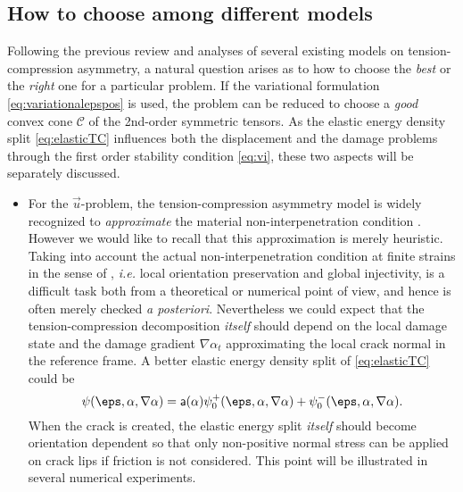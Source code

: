 \subsection{How to choose among different models} \label{sec:howtochoose}
Following the previous review and analyses of several existing models on tension-compression asymmetry, a natural question arises as to how to choose the \emph{best} or the \emph{right} one for a particular problem. If the variational formulation \eqref{eq:variationalepspos} is used, the problem can be reduced to choose a \emph{good} convex cone $\mathcal{C}$ of the 2nd-order symmetric tensors. As the elastic energy density split \eqref{eq:elasticTC} influences both the displacement and the damage problems through the first order stability condition \eqref{eq:vi}, these two aspects will be separately discussed.
\begin{itemize}
\item For the $\vec{u}$-problem, the tension-compression asymmetry model is widely recognized to \emph{approximate} the material non-interpenetration condition \cite{LancioniRoyer-Carfagni:2009,AmorMarigoMaurini:2009,AmbatiGerasimovLorenzis:2015}. However we would like to recall that this approximation is merely heuristic. Taking into account the actual non-interpenetration condition at finite strains in the sense of \cite{CiarletNecas:1987}, \emph{i.e.} local orientation preservation and global injectivity, is a difficult task both from a theoretical or numerical point of view, and hence is often merely checked \emph{a posteriori}. Nevertheless we could expect that the tension-compression decomposition \emph{itself} should depend on the local damage state and the damage gradient $\nabla\alpha_t$ approximating the local crack normal in the reference frame. A better elastic energy density split of \eqref{eq:elasticTC} could be
\begin{equation}
\psi(\eps,\alpha,\nabla\alpha)=\mathsf{a}(\alpha)\psi_0^+(\eps,\alpha,\nabla\alpha)+\psi_0^-(\eps,\alpha,\nabla\alpha).
\end{equation}
When the crack is created, the elastic energy split \emph{itself} should become orientation dependent so that only non-positive normal stress can be applied on crack lips if friction is not considered. This point will be illustrated in several numerical experiments.


\end{itemize}
